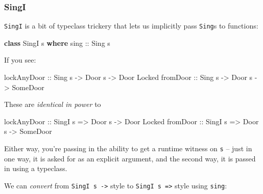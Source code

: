 \documentclass[]{article}
\newenvironment{Shaded}{}{}
\newcommand{\DataTypeTok}[1]{\textcolor[rgb]{0.56,0.13,0.00}{#1}}
\newcommand{\KeywordTok}[1]{\textcolor[rgb]{0.00,0.44,0.13}{\textbf{#1}}}
\newcommand{\NormalTok}[1]{#1}
\newcommand{\OtherTok}[1]{\textcolor[rgb]{0.00,0.44,0.13}{#1}}
\begin{document}
\hypertarget{singi}{%
\subsubsection{SingI}\label{singi}}

\texttt{SingI} is a bit of typeclass trickery that lets us implicitly pass
\texttt{Sing}s to functions:

\begin{Shaded}
\begin{Highlighting}[]
\KeywordTok{class} \DataTypeTok{SingI}\NormalTok{ s }\KeywordTok{where}
\OtherTok{    sing ::} \DataTypeTok{Sing}\NormalTok{ s}
\end{Highlighting}
\end{Shaded}

If you see:

\begin{Shaded}
\begin{Highlighting}[]
\OtherTok{lockAnyDoor ::} \DataTypeTok{Sing}\NormalTok{  s }\OtherTok{{-}>} \DataTypeTok{Door}\NormalTok{ s }\OtherTok{{-}>} \DataTypeTok{Door} \DataTypeTok{\textquotesingle{}Locked}
\OtherTok{fromDoor    ::} \DataTypeTok{Sing}\NormalTok{  s }\OtherTok{{-}>} \DataTypeTok{Door}\NormalTok{ s }\OtherTok{{-}>} \DataTypeTok{SomeDoor}
\end{Highlighting}
\end{Shaded}

These are \emph{identical in power} to

\begin{Shaded}
\begin{Highlighting}[]
\OtherTok{lockAnyDoor ::} \DataTypeTok{SingI}\NormalTok{ s }\OtherTok{=>} \DataTypeTok{Door}\NormalTok{ s }\OtherTok{{-}>} \DataTypeTok{Door} \DataTypeTok{\textquotesingle{}Locked}
\OtherTok{fromDoor    ::} \DataTypeTok{SingI}\NormalTok{ s }\OtherTok{=>} \DataTypeTok{Door}\NormalTok{ s }\OtherTok{{-}>} \DataTypeTok{SomeDoor}
\end{Highlighting}
\end{Shaded}

Either way, you're passing in the ability to get a runtime witness on \texttt{s}
-- just in one way, it is asked for as an explicit argument, and the second way,
it is passed in using a typeclass.

We can \emph{convert} from \texttt{SingI\ s\ -\textgreater{}} style to
\texttt{SingI\ s\ =\textgreater{}} style using \texttt{sing}:
\end{document}
